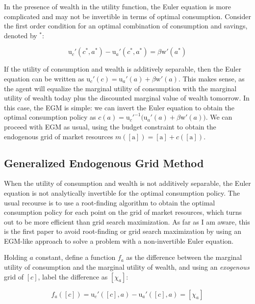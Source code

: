 \documentclass{article}
\newcommand{\DiscFac}{\beta}
\newcommand{\uFunc}{\mathrm{u}}
\newcommand{\aNrm}{a}
\newcommand{\cNrm}{c}
\newcommand{\wFunc}{\mathrm{w}}
\newcommand{\aMat}{[\mathrm{a}]}
\newcommand{\mNrm}{m}
\newcommand{\xFer}{\chi}
\begin{document}
In the presence of wealth in the utility function, the Euler equation is more complicated and may not be invertible in terms of optimal consumption. Consider the first order condition for an optimal combination of consumption and savings, denoted by $^*$:

\begin{equation}
\uFunc_{c}'(\cNrm^*, \aNrm^*) - \uFunc_{a}'(\cNrm^*, \aNrm^*) = \DiscFac \wFunc'(\aNrm^*)
\end{equation}

If the utility of consumption and wealth is additively separable, then the Euler equation can be written as $\uFunc_{c}'(\cNrm) = \uFunc_{a}'(\aNrm) + \DiscFac \wFunc'(\aNrm)$. This makes sense, as the agent will equalize the marginal utility of consumption with the marginal utility of wealth today plus the discounted marginal value of wealth tomorrow. In this case, the EGM is simple: we can invert the Euler equation to obtain the optimal consumption policy as $\cNrm(\aNrm) = \uFunc_{c}'^{ -1}\big(\uFunc_{a}'(\aNrm) + \DiscFac \wFunc'(\aNrm)\big)$. We can proceed with EGM as usual, using the budget constraint to obtain the endogenous grid of market resources $\mNrm(\aMat) = \aMat + \cNrm(\aMat)$.

\subsection{Generalized Endogenous Grid Method}\label{Generalized Endogenous Grid Method}

When the utility of consumption and wealth is not additively separable, the Euler equation is not analytically invertible for the optimal consumption policy. The usual recourse is to use a root-finding algorithm to obtain the optimal consumption policy for each point on the grid of market resources, which turns out to be more efficient than grid search maximization. As far as I am aware, this is the first paper to avoid root-finding or grid search maximization by using an EGM-like approach to solve a problem with a non-invertible Euler equation.

Holding $\aNrm$ constant, define a function $f_{a}$ as the difference between the marginal utility of consumption and the marginal utility of wealth, and using an \textit{exogenous} grid of $[\cNrm]$, label the difference as $[\xFer_{a}]$:

\begin{equation}
f_{a}([\cNrm]) = \uFunc_{c}'([\cNrm], \aNrm) - \uFunc_{a}'([\cNrm], \aNrm) = [\xFer_{a}]
\end{equation}
\end{document}
